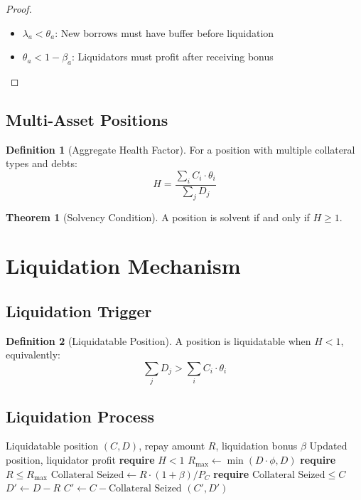 \documentclass[11pt,a4paper]{article}
\theoremstyle{definition}
\newtheorem{definition}{Definition}
\newtheorem{theorem}{Theorem}
\begin{document}
\begin{proof}
\begin{itemize}
\item $\lambda_a < \theta_a$: New borrows must have buffer before liquidation
\item $\theta_a < 1 - \beta_a$: Liquidators must profit after receiving bonus
\end{itemize}
\end{proof}

\subsection{Multi-Asset Positions}

\begin{definition}[Aggregate Health Factor]
For a position with multiple collateral types and debts:
\begin{equation}
H = \frac{\sum_i C_i \cdot \theta_i}{\sum_j D_j}
\end{equation}
\end{definition}

\begin{theorem}[Solvency Condition]
A position is solvent if and only if $H \geq 1$.
\end{theorem}

\section{Liquidation Mechanism}

\subsection{Liquidation Trigger}

\begin{definition}[Liquidatable Position]
A position is liquidatable when $H < 1$, equivalently:
\begin{equation}
\sum_j D_j > \sum_i C_i \cdot \theta_i
\end{equation}
\end{definition}

\subsection{Liquidation Process}

\begin{algorithm}
\caption{Liquidation Execution}
\begin{algorithmic}[1]
\Require Liquidatable position $(C, D)$, repay amount $R$, liquidation bonus $\beta$
\Ensure Updated position, liquidator profit
\State \textbf{require} $H < 1$
\State $R_{\max} \gets \min(D \cdot \phi, D)$ 
\State \textbf{require} $R \leq R_{\max}$
\State $\text{Collateral Seized} \gets R \cdot (1 + \beta) / P_C$
\State \textbf{require} $\text{Collateral Seized} \leq C$
\State $D' \gets D - R$
\State $C' \gets C - \text{Collateral Seized}$
\State \Return $(C', D')$
\end{algorithmic}
\end{algorithm}
\end{document}
